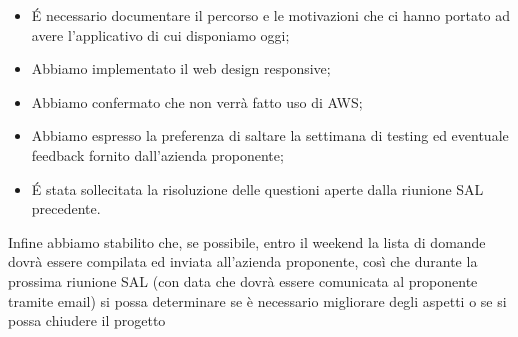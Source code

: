 \begin{itemize}
    \item \'E necessario documentare il percorso e le motivazioni che ci hanno portato ad avere l'applicativo di cui disponiamo oggi;
    \item Abbiamo implementato il web design responsive;
    \item Abbiamo confermato che non verrà fatto uso di AWS;
    \item Abbiamo espresso la preferenza di saltare la settimana di testing ed eventuale feedback fornito dall'azienda proponente;
    \item \'E stata sollecitata la risoluzione delle questioni aperte dalla riunione SAL precedente.
\end{itemize}
Infine abbiamo stabilito che, se possibile, entro il weekend la lista di domande dovrà essere compilata ed inviata all'azienda proponente, così che durante la prossima riunione SAL (con data che dovrà essere comunicata al proponente tramite email) si possa determinare se è necessario migliorare degli aspetti o se si possa chiudere il progetto